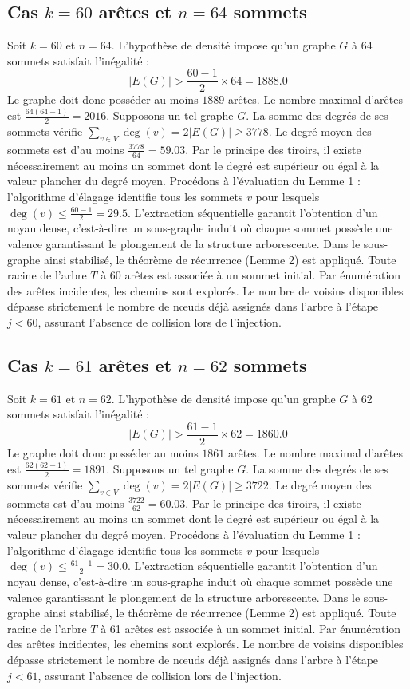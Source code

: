 \documentclass[12pt,a4paper]{article}
\begin{document}
\subsection{Cas $k = 60$ arêtes et $n = 64$ sommets}
Soit $k = 60$ et $n = 64$. L'hypothèse de densité impose qu'un graphe $G$ à 64 sommets satisfait l'inégalité :
$$ |E(G)| > \frac{60-1}{2} \times 64 = 1888.0 $$
Le graphe doit donc posséder au moins $1889$ arêtes. Le nombre maximal d'arêtes est $\frac{64(64-1)}{2} = 2016$.
Supposons un tel graphe $G$. La somme des degrés de ses sommets vérifie $\sum_{v \in V} \deg(v) = 2|E(G)| \geq 3778$.
Le degré moyen des sommets est d'au moins $\frac{3778}{64} = 59.03$.
Par le principe des tiroirs, il existe nécessairement au moins un sommet dont le degré est supérieur ou égal à la valeur plancher du degré moyen.
Procédons à l'évaluation du Lemme 1 : l'algorithme d'élagage identifie tous les sommets $v$ pour lesquels $\deg(v) \leq \frac{60-1}{2} = 29.5$.
L'extraction séquentielle garantit l'obtention d'un noyau dense, c'est-à-dire un sous-graphe induit où chaque sommet possède une valence garantissant le plongement de la structure arborescente.
Dans le sous-graphe ainsi stabilisé, le théorème de récurrence (Lemme 2) est appliqué. Toute racine de l'arbre $T$ à 60 arêtes est associée à un sommet initial. Par énumération des arêtes incidentes, les chemins sont explorés. Le nombre de voisins disponibles dépasse strictement le nombre de nœuds déjà assignés dans l'arbre à l'étape $j < 60$, assurant l'absence de collision lors de l'injection.

\subsection{Cas $k = 61$ arêtes et $n = 62$ sommets}
Soit $k = 61$ et $n = 62$. L'hypothèse de densité impose qu'un graphe $G$ à 62 sommets satisfait l'inégalité :
$$ |E(G)| > \frac{61-1}{2} \times 62 = 1860.0 $$
Le graphe doit donc posséder au moins $1861$ arêtes. Le nombre maximal d'arêtes est $\frac{62(62-1)}{2} = 1891$.
Supposons un tel graphe $G$. La somme des degrés de ses sommets vérifie $\sum_{v \in V} \deg(v) = 2|E(G)| \geq 3722$.
Le degré moyen des sommets est d'au moins $\frac{3722}{62} = 60.03$.
Par le principe des tiroirs, il existe nécessairement au moins un sommet dont le degré est supérieur ou égal à la valeur plancher du degré moyen.
Procédons à l'évaluation du Lemme 1 : l'algorithme d'élagage identifie tous les sommets $v$ pour lesquels $\deg(v) \leq \frac{61-1}{2} = 30.0$.
L'extraction séquentielle garantit l'obtention d'un noyau dense, c'est-à-dire un sous-graphe induit où chaque sommet possède une valence garantissant le plongement de la structure arborescente.
Dans le sous-graphe ainsi stabilisé, le théorème de récurrence (Lemme 2) est appliqué. Toute racine de l'arbre $T$ à 61 arêtes est associée à un sommet initial. Par énumération des arêtes incidentes, les chemins sont explorés. Le nombre de voisins disponibles dépasse strictement le nombre de nœuds déjà assignés dans l'arbre à l'étape $j < 61$, assurant l'absence de collision lors de l'injection.
\end{document}
